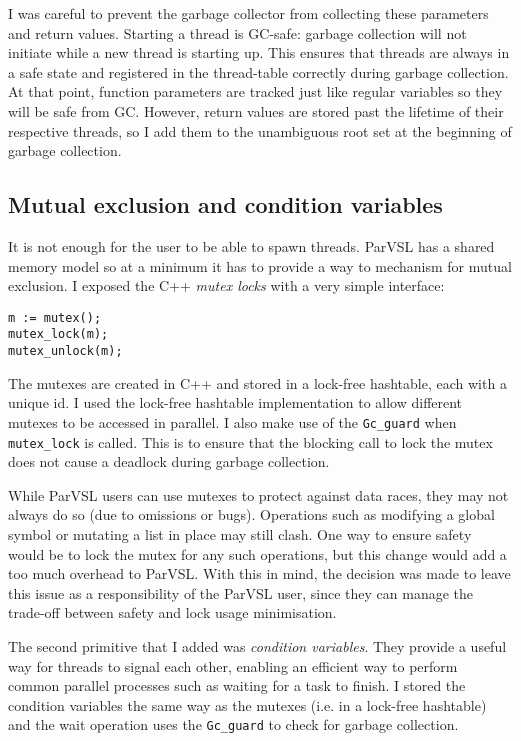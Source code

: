 I was careful to prevent the garbage collector from collecting these parameters and return values.
Starting a thread is GC-safe: garbage collection will not initiate while a new thread is starting up. This ensures
that threads are always in a safe state and registered in the thread-table correctly during garbage collection.
At that point, function parameters are tracked just like regular variables so they will be safe from GC.
However, return values are stored past the lifetime of their respective threads, so I add them
to the unambiguous root set at the beginning of garbage collection.

\subsection{Mutual exclusion and condition variables}

It is not enough for the user to be able to spawn threads. ParVSL has a shared memory model so at a minimum
it has to provide a way to mechanism for mutual exclusion. I exposed the C++ \emph{mutex locks}
with a very simple interface:

\begin{verbatim}
m := mutex();
mutex_lock(m);
mutex_unlock(m);
\end{verbatim}

The mutexes are created in C++ and stored in a lock-free hashtable, each with a unique id. I used the lock-free
hashtable implementation to allow different mutexes to be accessed in parallel. I also
make use of the \verb|Gc_guard| when \verb|mutex_lock| is called. This is to ensure that the blocking
call to lock the mutex does not cause a deadlock during garbage collection.

While ParVSL users can use mutexes to protect against data races, they may not always do so
(due to omissions or bugs). Operations such as modifying a global symbol or mutating a list in place
may still clash.
One way to ensure safety would be to lock the mutex for any such operations, but this change would add a
too much overhead to ParVSL. With this in mind, the decision was made to leave this issue as a responsibility
of the ParVSL user, since they can manage the trade-off between safety and lock usage minimisation.

The second primitive that I added was \emph{condition variables}. They provide a useful way for
threads to signal each other, enabling an efficient way to perform common parallel processes such as
waiting for a task to finish. I stored the condition variables the same way as the mutexes (i.e. in a lock-free
hashtable) and the wait operation uses the \verb|Gc_guard| to check for garbage collection.

